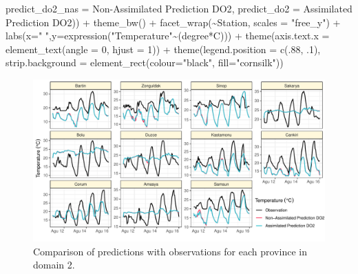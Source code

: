 \documentclass[
  letterpaper,
  DIV=11,
  numbers=noendperiod,
  abstract]{scrartcl}
\newenvironment{Shaded}{\begin{snugshade}}{\end{snugshade}}
\newcommand{\AttributeTok}[1]{\textcolor[rgb]{0.40,0.45,0.13}{#1}}
\newcommand{\DecValTok}[1]{\textcolor[rgb]{0.68,0.00,0.00}{#1}}
\newcommand{\FunctionTok}[1]{\textcolor[rgb]{0.28,0.35,0.67}{#1}}
\newcommand{\NormalTok}[1]{\textcolor[rgb]{0.00,0.23,0.31}{#1}}
\newcommand{\OtherTok}[1]{\textcolor[rgb]{0.00,0.23,0.31}{#1}}
\newcommand{\SpecialCharTok}[1]{\textcolor[rgb]{0.37,0.37,0.37}{#1}}
\newcommand{\StringTok}[1]{\textcolor[rgb]{0.13,0.47,0.30}{#1}}
\begin{document}
\begin{Shaded}
\begin{Highlighting}[]
                     \StringTok{\textquotesingle{}predict\_do2\_nas\textquotesingle{}} \OtherTok{=} \StringTok{\textquotesingle{}Non{-}Assimilated Prediction DO2\textquotesingle{}}\NormalTok{,}
                     \StringTok{\textquotesingle{}predict\_do2\textquotesingle{}} \OtherTok{=} \StringTok{\textquotesingle{}Assimilated Prediction DO2\textquotesingle{}}\NormalTok{)) }\SpecialCharTok{+} 
  \FunctionTok{theme\_bw}\NormalTok{() }\SpecialCharTok{+} \FunctionTok{facet\_wrap}\NormalTok{(}\SpecialCharTok{\textasciitilde{}}\NormalTok{Station, }\AttributeTok{scales =} \StringTok{"free\_y"}\NormalTok{) }\SpecialCharTok{+} 
  \FunctionTok{labs}\NormalTok{(}\AttributeTok{x=}\StringTok{" "}\NormalTok{,}\AttributeTok{y=}\FunctionTok{expression}\NormalTok{(}\StringTok{"Temperature"}\SpecialCharTok{\textasciitilde{}}\NormalTok{(degree}\SpecialCharTok{*}\NormalTok{C))) }\SpecialCharTok{+} 
  \FunctionTok{theme}\NormalTok{(}\AttributeTok{axis.text.x =} \FunctionTok{element\_text}\NormalTok{(}\AttributeTok{angle =} \DecValTok{0}\NormalTok{, }\AttributeTok{hjust =} \DecValTok{1}\NormalTok{))  }\SpecialCharTok{+}
  \FunctionTok{theme}\NormalTok{(}\AttributeTok{legend.position =} \FunctionTok{c}\NormalTok{(.}\DecValTok{88}\NormalTok{, .}\DecValTok{1}\NormalTok{), }
        \AttributeTok{strip.background =} \FunctionTok{element\_rect}\NormalTok{(}\AttributeTok{colour=}\StringTok{"black"}\NormalTok{, }\AttributeTok{fill=}\StringTok{"cornsilk"}\NormalTok{))}
\end{Highlighting}
\end{Shaded}

\begin{figure}[H]

{\centering \includegraphics{WRF_pdf_files/figure-pdf/fig-do2-1.pdf}

}

\caption{\label{fig-do2}Comparison of predictions with observations for
each province in domain 2.}

\end{figure}
\end{document}
